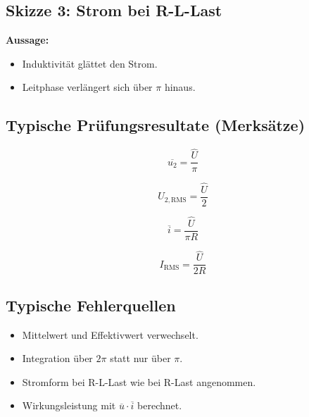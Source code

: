 \subsection{Skizze 3: Strom bei R-L-Last}

\begin{center}
\end{center}

\textbf{Aussage:}
\begin{itemize}
    \item Induktivität glättet den Strom.
    \item Leitphase verlängert sich über $\pi$ hinaus.
\end{itemize}

\subsection{Typische Prüfungsresultate (Merksätze)}

\[
\overline{u_2} = \dfrac{\hat U}{\pi}
\]

\[
U_{2,\mathrm{RMS}} = \dfrac{\hat U}{2}
\]

\[
\overline{i} = \dfrac{\hat U}{\pi R}
\]

\[
I_{\mathrm{RMS}} = \dfrac{\hat U}{2R}
\]

\subsection{Typische Fehlerquellen}

\begin{itemize}
    \item Mittelwert und Effektivwert verwechselt.
    \item Integration über $2\pi$ statt nur über $\pi$.
    \item Stromform bei R-L-Last wie bei R-Last angenommen.
    \item Wirkungsleistung mit $\overline{u}\cdot\overline{i}$ berechnet.
\end{itemize}

